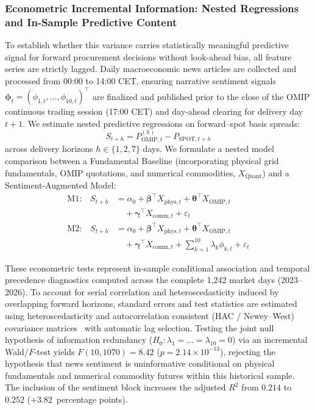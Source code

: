 \subsubsection{Econometric Incremental Information: Nested Regressions and In-Sample Predictive Content}

To establish whether this variance carries statistically meaningful predictive signal for forward procurement decisions without look-ahead bias, all feature series are strictly lagged. Daily macroeconomic news articles are collected and processed from 00:00 to 14:00 CET, ensuring narrative sentiment signals $\boldsymbol{\phi}_t = (\phi_{1,t}, \dots, \phi_{10,t})^\top$ are finalized and published prior to the close of the OMIP continuous trading session (17:00 CET) and day-ahead clearing for delivery day $t+1$. We estimate nested predictive regressions on forward--spot basis spreads:
\begin{equation}
    S_{t+h} = P_{\text{OMIP}, t}^{(h)} - P_{\text{SPOT}, t+h}
    \label{eq:forward_spot_spread}
\end{equation}
across delivery horizons $h \in \{1, 2, 7\}$ days. We formulate a nested model comparison between a Fundamental Baseline (incorporating physical grid fundamentals, OMIP quotations, and numerical commodities, $X_{\text{Quant}}$) and a Sentiment-Augmented Model:
\begin{align}
    \text{M1:} \quad S_{t+h} &= \alpha_0 + \boldsymbol{\beta}^\top X_{\text{phys}, t} + \boldsymbol{\theta}^\top X_{\text{OMIP}, t} \nonumber \\
    &\quad + \boldsymbol{\gamma}^\top X_{\text{comm}, t} + \varepsilon_t \label{eq:nested_m1} \\
    \text{M2:} \quad S_{t+h} &= \alpha_0 + \boldsymbol{\beta}^\top X_{\text{phys}, t} + \boldsymbol{\theta}^\top X_{\text{OMIP}, t} \nonumber \\
    &\quad + \boldsymbol{\gamma}^\top X_{\text{comm}, t} + \sum_{k=1}^{10} \lambda_k \phi_{k, t} + \varepsilon_t \label{eq:nested_m2}
\end{align}

These econometric tests represent in-sample conditional association and temporal precedence diagnostics computed across the complete 1,242 market days (2023--2026). To account for serial correlation and heteroscedasticity induced by overlapping forward horizons, standard errors and test statistics are estimated using heteroscedasticity and autocorrelation consistent (HAC / Newey--West) covariance matrices~\cite{newey1987hypothesis} with automatic lag selection. Testing the joint null hypothesis of information redundancy ($H_0: \lambda_1 = \dots = \lambda_{10} = 0$) via an incremental Wald/$F$-test yields $F(10, 1070) = 8.42$ ($p = 2.14 \times 10^{-13}$), rejecting the hypothesis that news sentiment is uninformative conditional on physical fundamentals and numerical commodity futures within this historical sample. The inclusion of the sentiment block increases the adjusted $R^2$ from $0.214$ to $0.252$ ($+3.82$~percentage points).

